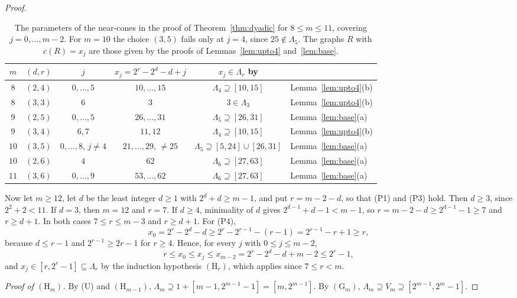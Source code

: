 \documentclass[11pt]{amsart}
\theoremstyle{definition}
\theoremstyle{remark}
\newcommand{\Lam}{\Lambda}
\begin{document}
\begin{proof}
\begin{table}[ht]
\centering
\small
\begin{tabular}{cccccl}
\toprule
$m$ & $(d,r)$ & $j$ & $x_j=2^r-2^d-d+j$ & $x_j\in\Lam_r$ by & \\
\midrule
$8$ & $(2,4)$ & $0,\dots,5$ & $10,\dots,15$ & $\Lam_4\supseteq[10,15]$ & Lemma~\ref{lem:upto4}(b)\\
$8$ & $(3,3)$ & $6$ & $3$ & $3\in\Lam_3$ & Lemma~\ref{lem:upto4}(b)\\
$9$ & $(2,5)$ & $0,\dots,5$ & $26,\dots,31$ & $\Lam_5\supseteq[26,31]$ & Lemma~\ref{lem:base}(a)\\
$9$ & $(3,4)$ & $6,7$ & $11,12$ & $\Lam_4\supseteq[10,15]$ & Lemma~\ref{lem:upto4}(b)\\
$10$ & $(3,5)$ & $0,\dots,8$, $j\ne4$ & $21,\dots,29$, $\ne25$ & $\Lam_5\supseteq[5,24]\cup[26,31]$ & Lemma~\ref{lem:base}(a)\\
$10$ & $(2,6)$ & $4$ & $62$ & $\Lam_6\supseteq[27,63]$ & Lemma~\ref{lem:base}(a)\\
$11$ & $(3,6)$ & $0,\dots,9$ & $53,\dots,62$ & $\Lam_6\supseteq[27,63]$ & Lemma~\ref{lem:base}(a)\\
\bottomrule
\end{tabular}
\caption{The parameters of the near-cones in the proof of Theorem~\ref{thm:dyadic} for $8\le m\le11$, covering $j=0,\dots,m-2$. For $m=10$ the choice $(3,5)$ fails only at $j=4$, since $25\notin\Lam_5$. The graphs $R$ with $c(R)=x_j$ are those given by the proofs of Lemmas~\ref{lem:upto4} and~\ref{lem:base}.}
\label{tab:smallm}
\end{table}

Now let $m\ge12$, let $d$ be the least integer $d\ge1$ with $2^d+d\ge m-1$, and put $r=m-2-d$, so that (P1) and (P3) hold. Then $d\ge3$, since $2^2+2<11$. If $d=3$, then $m=12$ and $r=7$. If $d\ge4$, minimality of $d$ gives $2^{d-1}+d-1<m-1$, so $r=m-2-d\ge2^{d-1}-1\ge7$ and $r\ge d+1$. In both cases $7\le r\le m-3$ and $r\ge d+1$. For (P4),
\[
x_0=2^r-2^d-d\ge2^r-2^{r-1}-(r-1)=2^{r-1}-r+1\ge r,
\]
because $d\le r-1$ and $2^{r-1}\ge2r-1$ for $r\ge4$. Hence, for every $j$ with $0\le j\le m-2$,
\[
r\le x_0\le x_j\le x_{m-2}=2^r-2^d-d+m-2\le2^r-1,
\]
and $x_j\in[r,2^r-1]\subseteq\Lam_r$ by the induction hypothesis $(\mathrm H_r)$, which applies since $7\le r<m$.

\emph{Proof of $(\mathrm H_m)$.} By (U) and $(\mathrm H_{m-1})$, $\Lam_m\supseteq1+[m-1,2^{m-1}-1]=[m,2^{m-1}]$. By $(\mathrm G_m)$, $\Lam_m\supseteq V_m\supseteq[2^{m-1},2^m-1]$.
\end{proof}
\end{document}
